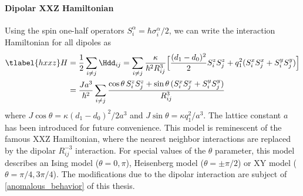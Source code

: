 \paragraph{Dipolar XXZ Hamiltonian}
Using the spin one-half operators $S^\alpha_i = \hbar \sigma^\alpha_i/2$, we can write the interaction Hamiltonian for all dipoles as
\begin{align} \tlabel{hxxz}
    H &= \frac{1}{2} \sum_{i\ne j} \Hdd_{ij} = \sum_{i\ne j} \frac{\kappa}{\hbar^2 R_{ij}^3} \Big[ \frac{(d_1-d_0)^2}{2} S^z_i S^z_j  + q_1^2 (S^x_i S^x_j + S^y_i S^y_j) \Big] \\
         &= \frac{Ja^3}{\hbar^2} \sum_{i\ne j} \frac{\cos\theta\, S^z_i S^z_j  + \sin\theta\, (S^x_i S^x_j + S^y_i S^y_j)}{R_{ij}^3}
\end{align}
where $J\cos\theta = \kappa (d_1-d_0)^2/2a^3$ and $J\sin\theta = \kappa q_1^2/a^3$. The lattice constant $a$ has been introduced for future convenience.
This model is reminescent of the famous XXZ Hamiltonian, where the nearest neighbor interactions are replaced by the dipolar $R_{ij}^{-3}$ interaction. For special values of the $\theta$ parameter, this model describes an Ising model ($\theta = 0, \pi$), Heisenberg model ($\theta=\pm \pi/2$) or XY model ($\theta=\pi/4, 3\pi/4$). The modifications due to the dipolar interaction are subject of \cref{anomalous_behavior} of this thesis.

